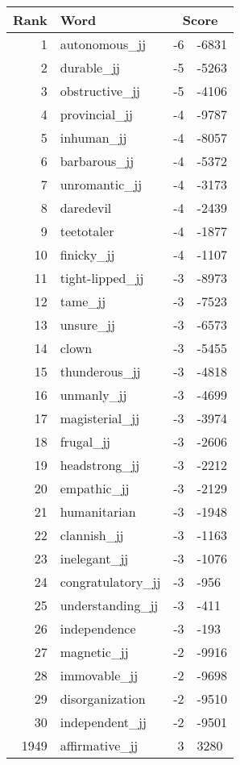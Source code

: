 \begin{longtable}[!htbp]{| rlr@{.}l |}
    \hline
    \textbf{Rank} & \textbf{Word} & \multicolumn{2}{c|}{\textbf{Score}} \\
    \hline
    \endhead
    1 & autonomous\_jj & -6 & -6831 \\
    2 & durable\_jj & -5 & -5263 \\
    3 & obstructive\_jj & -5 & -4106 \\
    4 & provincial\_jj & -4 & -9787 \\
    5 & inhuman\_jj & -4 & -8057 \\
    6 & barbarous\_jj & -4 & -5372 \\
    7 & unromantic\_jj & -4 & -3173 \\
    8 & daredevil & -4 & -2439 \\
    9 & teetotaler & -4 & -1877 \\
    10 & finicky\_jj & -4 & -1107 \\
    11 & tight-lipped\_jj & -3 & -8973 \\
    12 & tame\_jj & -3 & -7523 \\
    13 & unsure\_jj & -3 & -6573 \\
    14 & clown & -3 & -5455 \\
    15 & thunderous\_jj & -3 & -4818 \\
    16 & unmanly\_jj & -3 & -4699 \\
    17 & magisterial\_jj & -3 & -3974 \\
    18 & frugal\_jj & -3 & -2606 \\
    19 & headstrong\_jj & -3 & -2212 \\
    20 & empathic\_jj & -3 & -2129 \\
    21 & humanitarian & -3 & -1948 \\
    22 & clannish\_jj & -3 & -1163 \\
    23 & inelegant\_jj & -3 & -1076 \\
    24 & congratulatory\_jj & -3 & -956 \\
    25 & understanding\_jj & -3 & -411 \\
    26 & independence & -3 & -193 \\
    27 & magnetic\_jj & -2 & -9916 \\
    28 & immovable\_jj & -2 & -9698 \\
    29 & disorganization & -2 & -9510 \\
    30 & independent\_jj & -2 & -9501 \\
    1949 & affirmative\_jj & 3 & 3280 \\

\end{longtable}
